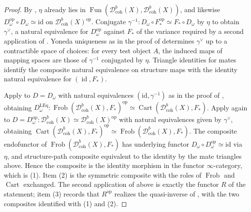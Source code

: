 \documentclass[11pt]{amsart}
\newcommand{\Cart}{\operatorname{Cart}}
\newcommand{\id}{\operatorname{id}}
\newcommand{\op}{{\operatorname{op}}}
\DeclareMathOperator{\Fun}{\mathrm{Fun}}
\newcommand{\Frob}{\operatorname{Frob}}
\newcommand{\Dbc}{\mathcal D^b_{\mathrm{coh}}}
\theoremstyle{plain}
\theoremstyle{definition}
\numberwithin{equation}{section}
\begin{document}
\begin{proof}
By , $\eta$ already lies in $\Fun(\Dbc(X),\Dbc(X))$, and likewise $D_\omega^{\op}\circ D_\omega\simeq\mathrm{id}$ on $\Dbc(X)^{\op}$.
Conjugate $\gamma^{-1}:D_\omega\circ F_*^{\op}\simeq F_*\circ D_\omega$ by $\eta$ to obtain $\gamma^\vee$, a natural equivalence for $D_\omega^{\op}$ against $F_*$ of the variance required by a second application of .
Yoneda uniqueness as in the proof of  determines $\gamma^\vee$ up to a contractible space of choices: for every test object $A$, the induced maps of mapping spaces are those of $\gamma^{-1}$ conjugated by $\eta$.
Triangle identities for mates identify the composite natural equivalence on structure maps with the identity natural equivalence for $(\id,F_*)$.

Apply  to $D=D_\omega$ with natural equivalences $(\mathrm{id},\gamma^{-1})$ as in the proof of , obtaining $D_\omega^{\mathrm{LEq}}:\Frob(\Dbc(X),F_*)^{\op}\simeq\Cart(\Dbc(X),F_*)$.
Apply  again to $D=D_\omega^{\op}:\Dbc(X)\simeq\Dbc(X)^{\op}$ with natural equivalences given by $\gamma^\vee$, obtaining $\Cart(\Dbc(X),F_*)^{\op}\simeq\Frob(\Dbc(X),F_*)$.
The composite endofunctor of $\Frob(\Dbc(X),F_*)$ has underlying functor $D_\omega\circ D_\omega^{\op}\simeq\mathrm{id}$ via $\eta$, and structure-path composite equivalent to the identity by the mate triangles above.
Hence the composite is the identity morphism in the functor $\infty$-category, which is \textup{(1)}.
Item \textup{(2)} is the symmetric composite with the roles of $\Frob$ and $\Cart$ exchanged.
The second application of  above is exactly the functor $R$ of the statement; item \textup{(3)} records that $R^{\op}$ realizes the quasi-inverse of , with the two composites identified with \textup{(1)} and \textup{(2)}.
\end{proof}
\end{document}
